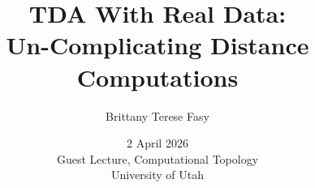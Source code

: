 \documentclass{beamer}
\title[TDA with Real Data]{
TDA With Real Data:\\
Un-Complicating Distance Computations
}
\author[B.\ Fasy]{Brittany Terese Fasy}
\institute[MSU]{Montana State University}
\date[2 April 2026]{2 April 2026\\
    Guest Lecture, Computational Topology\\
    University of Utah}
\begin{document}
\begin{frame}
\titlepage
\end{frame}












\end{document}
